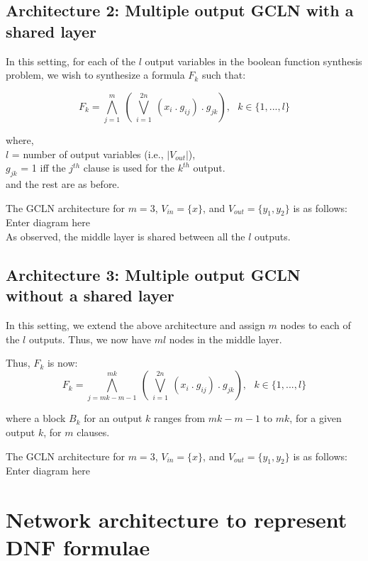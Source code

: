 \subsection{Architecture 2: Multiple output GCLN with a shared layer}

In this setting, for each of the $l$ output variables in the boolean function synthesis problem, we wish to synthesize a formula $F_k$ such that:

\[ F_k = \bigwedge_{j = 1}^m \ (\  \bigvee_{i=1}^{2n}\  (x_i\ .\ g_{ij})\ .\ g_{jk}), \ \ \ k \in \{1, ..., l\}\]

where,  \\ 

$l$ = number of output variables (i.e.,  $|V_{out}|$), \\
$g_{jk}$ = 1 iff the $j^{th}$ clause is used for the $k^{th}$ output.\\
and the rest are as before.

The GCLN architecture for $m = 3$,  $V_{in} = \{ x\}$, and $V_{out} = \{ y_1, y_2\}$ is as follows: \\

Enter diagram here \\

As observed,  the middle layer is shared between all the $l$ outputs.
\subsection{Architecture 3: Multiple output GCLN without a shared layer}

In this setting, we extend the above architecture and assign $m$ nodes to each of the $l$ outputs. Thus, we now have $ml$ nodes in the middle layer.

Thus, $F_k$ is now:
\[ F_k = \bigwedge_{j = mk-m-1}^{mk} \ (\  \bigvee_{i=1}^{2n}\  (x_i\ .\ g_{ij})\ .\ g_{jk}), \ \ \ k \in \{1, ..., l\}\]

where a block $B_k$ for an output $k$ ranges from $mk-m-1$ to $mk$, for a given output $k$, for $m$ clauses.

The GCLN architecture for $m = 3$,  $V_{in} = \{ x\}$, and $V_{out} = \{ y_1, y_2\}$ is as follows: \\

Enter diagram here \\

\section{Network architecture to represent DNF formulae}

